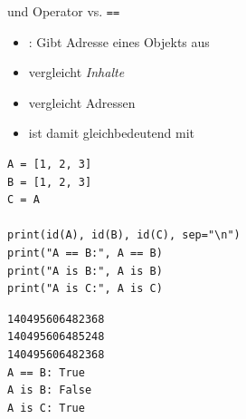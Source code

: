 \begin{frame}[fragile]{ und Operator  vs. \texttt{==}}
%
\begin{itemize}
\item {}: Gibt Adresse eines Objekts aus
\item \inPy{==} vergleicht \emph{Inhalte}
\item {} vergleicht Adressen
\item {} ist damit gleichbedeutend mit 
\end{itemize}
%
\begin{tcbraster}[raster columns=2,
                  raster equal height,
                  nobeforeafter,
                  raster column skip=0.5cm]
\begin{codebox}[Beispiel: \texttt{is} vs. \texttt{==}]
\begin{verbatim}
A = [1, 2, 3]
B = [1, 2, 3]
C = A

print(id(A), id(B), id(C), sep="\n")
print("A == B:", A == B)
print("A is B:", A is B)
print("A is C:", A is C)
\end{verbatim}
\end{codebox}
%
\begin{cmdbox}[Ausgabe]
\begin{verbatim}
140495606482368
140495606485248
140495606482368
A == B: True
A is B: False
A is C: True
\end{verbatim}
\end{cmdbox}
\end{tcbraster}
%
\end{frame}


